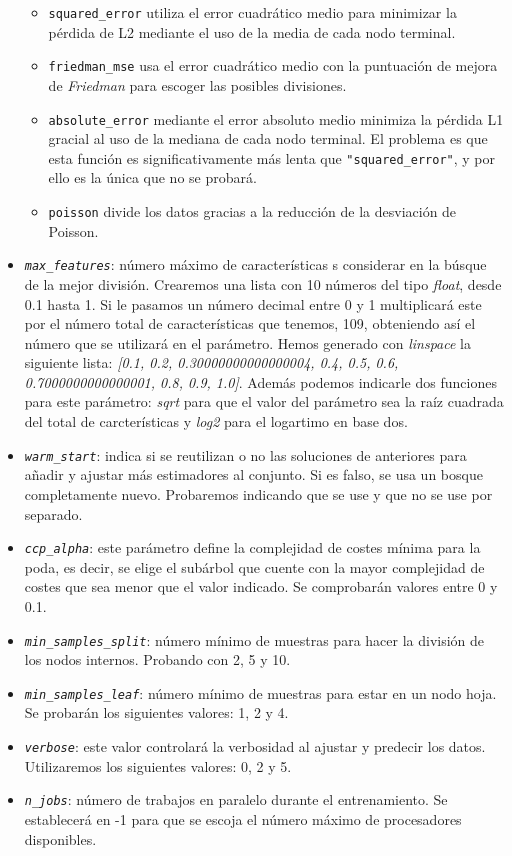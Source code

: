 \begin{itemize}
        \begin{itemize}
            \item \texttt{squared\_error} utiliza el error cuadrático medio para minimizar la pérdida de L2 mediante el uso de la media de cada nodo terminal.
            \item \texttt{friedman\_mse} usa el error cuadrático medio con la puntuación de mejora de \textit{Friedman} para escoger las posibles divisiones.
            \item \texttt{absolute\_error} mediante el error absoluto medio  minimiza la pérdida L1 gracial al uso de la mediana de cada nodo terminal. El problema es que esta función es significativamente más lenta que \texttt{"squared\_error"}, y por ello es la única que no se probará.
            \item \texttt{poisson} divide los datos gracias a la reducción de la desviación de Poisson. 
        \end{itemize}
    \item \texttt{\textit{max\_features}}: número máximo de características s considerar en la búsque de la mejor división. Crearemos una lista con 10 números del tipo \textit{float}, desde 0.1 hasta 1. Si le pasamos un número decimal entre 0 y 1 multiplicará este por el número total de características que tenemos, 109, obteniendo así el número que se utilizará en el parámetro. Hemos generado con \textit{linspace} la siguiente lista: \textit{[0.1, 0.2, 0.30000000000000004, 0.4, 0.5, 0.6, 0.7000000000000001, 0.8, 0.9, 1.0]}. Además podemos indicarle dos funciones para este parámetro: \textit{sqrt} para que el valor del parámetro sea la raíz cuadrada del total de carcterísticas y \textit{log2} para el logartimo en base dos.
    \item \texttt{\textit{warm\_start}}: indica si se reutilizan o no las soluciones de anteriores para añadir y ajustar más estimadores al conjunto. Si es falso, se usa un bosque completamente nuevo. Probaremos indicando que se use y que no se use por separado.
    \item \texttt{\textit{ccp\_alpha}}: este parámetro define la complejidad de costes mínima para la poda, es decir, se elige el subárbol que cuente con la mayor complejidad de costes que sea menor que el valor indicado. Se comprobarán valores entre 0 y 0.1.
    \item\texttt{\textit{min\_samples\_split}}: número mínimo de muestras para hacer la división de los nodos internos. Probando con 2, 5 y 10.
    \item \texttt{\textit{min\_samples\_leaf}}: número mínimo de muestras para estar en un nodo hoja. Se probarán los siguientes valores: 1, 2 y 4.
    \item \texttt{\textit{verbose}}: este valor controlará la verbosidad al ajustar y predecir los datos. Utilizaremos los siguientes valores: 0, 2 y 5.
    \item \texttt{\textit{n\_jobs}}: número de trabajos en paralelo durante el entrenamiento. Se establecerá en -1 para que se escoja el número máximo de procesadores disponibles.
\end{itemize}
